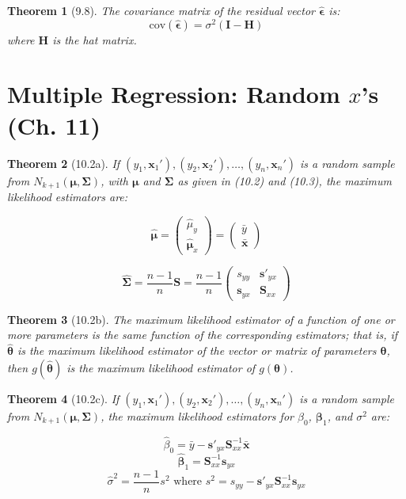 \documentclass{article}
\newtheorem{theorem}{Theorem}[section]
\begin{document}
\begin{theorem}[9.8]
The covariance matrix of the residual vector $\hat{\boldsymbol{\epsilon}}$ is:
\[\text{cov}(\hat{\boldsymbol{\epsilon}}) = \sigma^2(\mathbf{I} - \mathbf{H})\]
where $\mathbf{H}$ is the hat matrix.
\end{theorem}

\section{Multiple Regression: Random $x$’s (Ch. 11)}
\begin{theorem}[10.2a]
If $(y_1, \mathbf{x}_1'), (y_2, \mathbf{x}_2'), \ldots, (y_n, \mathbf{x}_n')$ is a random sample from $N_{k+1}(\boldsymbol{\mu}, \boldsymbol{\Sigma})$, with $\boldsymbol{\mu}$ and $\boldsymbol{\Sigma}$ as given in (10.2) and (10.3), the maximum likelihood estimators are:

\[\hat{\boldsymbol{\mu}} = \begin{pmatrix} \hat{\mu}_y \\ \hat{\boldsymbol{\mu}}_x \end{pmatrix} = \begin{pmatrix} \bar{y} \\ \bar{\mathbf{x}} \end{pmatrix}\]

\[\hat{\boldsymbol{\Sigma}} = \frac{n-1}{n}\mathbf{S} = \frac{n-1}{n}\begin{pmatrix} s_{yy} & \mathbf{s}'_{yx} \\ \mathbf{s}_{yx} & \mathbf{S}_{xx} \end{pmatrix}\]
\end{theorem}

\begin{theorem}[10.2b]
The maximum likelihood estimator of a function of one or more parameters is the same function of the corresponding estimators; that is, if $\hat{\boldsymbol{\theta}}$ is the maximum likelihood estimator of the vector or matrix of parameters $\boldsymbol{\theta}$, then $g(\hat{\boldsymbol{\theta}})$ is the maximum likelihood estimator of $g(\boldsymbol{\theta})$.
\end{theorem}

\begin{theorem}[10.2c]
If $(y_1, \mathbf{x}_1'), (y_2, \mathbf{x}_2'), \ldots, (y_n, \mathbf{x}_n')$ is a random sample from $N_{k+1}(\boldsymbol{\mu}, \boldsymbol{\Sigma})$, the maximum likelihood estimators for $\beta_0$, $\boldsymbol{\beta}_1$, and $\sigma^2$ are:

\[\hat{\beta}_0 = \bar{y} - \mathbf{s}'_{yx}\mathbf{S}_{xx}^{-1}\bar{\mathbf{x}}\]
\[\hat{\boldsymbol{\beta}}_1 = \mathbf{S}_{xx}^{-1}\mathbf{s}_{yx}\]
\[\hat{\sigma}^2 = \frac{n-1}{n}s^2 \text{ where } s^2 = s_{yy} - \mathbf{s}'_{yx}\mathbf{S}_{xx}^{-1}\mathbf{s}_{yx}\]
\end{theorem}
\end{document}
